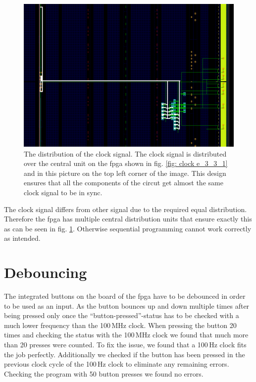 \begin{figure}[h]
	\centering
	\includegraphics[width=.8\linewidth]{./L3/E3/CLK.png}
	\caption{The distribution of the clock signal. The clock signal is distributed over the central unit on the \gls{fpga} shown in fig. \ref*{fig: clock  e_3_3_1} and in this picture on the top left corner of the image. This design ensures that all the components of the circut get almost the same clock signal to be in sync.}
	\label{fig: clock routing e_3_3_1}
\end{figure}

%

%



The clock signal differs from other signal due to the required equal distribution. Therefore the \gls{fpga} has multiple central distribution units that ensure exactly this as can be seen in fig. \ref{fig: clock routing e_3_3_1}. Otherwise sequential programming cannot work correctly as intended.

\section{Debouncing}

The integrated buttons on the board of the \gls{fpga} have to be debounced in order to be used as an input. As the button bounces up and down multiple times after being pressed only once the ``button-pressed''-status has to be checked with a much lower frequency than the 100\,MHz clock. When pressing the button 20 times and checking the status with the 100\,MHz clock we found that much more than 20 presses were counted. To fix the issue, we found that a 100\,Hz clock fits the job perfectly. Additionally we checked if the button has been pressed in the previous clock cycle of the 100\,Hz clock to eliminate any remaining errors. Checking the program with 50 button presses we found no errors.






